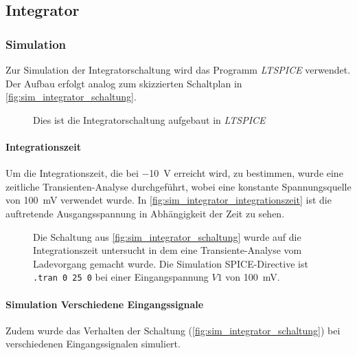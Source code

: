 \documentclass[12pt,english,ngerman]{scrartcl}
\begin{document}

\subsection{Integrator}

\subsubsection{Simulation}
Zur Simulation der Integratorschaltung wird das Programm
\textit{LTSPICE} verwendet. Der Aufbau erfolgt analog zum skizzierten
Schaltplan in \autoref{fig:sim_integrator_schaltung}. 

\begin{figure}[H]
  \centering
  \caption{Dies ist die Integratorschaltung aufgebaut in \textit{LTSPICE}}
  \label{fig:sim_integrator_schaltung}
\end{figure}

\paragraph{Integrationszeit}
Um die Integrationszeit, die bei \SI{-10}{\volt} erreicht wird, zu bestimmen,
wurde eine zeitliche Transienten-Analyse durchgeführt, wobei eine konstante
Spannungsquelle von \SI{100}{\milli\volt} verwendet wurde. In
\autoref{fig:sim_integrator_integrationszeit} ist die auftretende
Ausgangsspannung in Abhängigkeit der Zeit zu sehen.

\begin{figure}[H]
  \centering
  \caption{Die Schaltung aus \autoref{fig:sim_integrator_schaltung} wurde auf
  die Integrationszeit untersucht in dem eine Transiente-Analyse vom
  Ladevorgang gemacht wurde. Die Simulation SPICE-Directive ist \texttt{.tran 0 25 0} 
  bei einer Eingangspannung $V1$ von \SI{100}{\milli\volt}.}
  \label{fig:sim_integrator_integrationszeit}
\end{figure}

\paragraph{Simulation Verschiedene Eingangssignale}
Zudem wurde das Verhalten der Schaltung
(\autoref{fig:sim_integrator_schaltung}) bei verschiedenen Eingangssignalen
simuliert.
\end{document}

